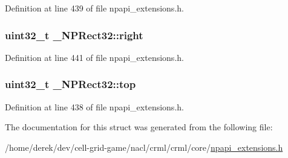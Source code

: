 Definition at line 439 of file npapi\_\-extensions.h.

\hypertarget{struct___n_p_rect32_add79a8f646aedef1922117689f857020}{
\subsubsection[{right}]{\setlength{\rightskip}{0pt plus 5cm}uint32\_\-t {\bf \_\-NPRect32::right}}}
\label{struct___n_p_rect32_add79a8f646aedef1922117689f857020}


Definition at line 441 of file npapi\_\-extensions.h.

\hypertarget{struct___n_p_rect32_aad5fdab264c55fd147ddf01407162cc6}{
\subsubsection[{top}]{\setlength{\rightskip}{0pt plus 5cm}uint32\_\-t {\bf \_\-NPRect32::top}}}
\label{struct___n_p_rect32_aad5fdab264c55fd147ddf01407162cc6}


Definition at line 438 of file npapi\_\-extensions.h.



The documentation for this struct was generated from the following file:\begin{DoxyCompactItemize}
\item 
/home/derek/dev/cell-\/grid-\/game/nacl/crml/crml/core/\hyperlink{npapi__extensions_8h}{npapi\_\-extensions.h}\end{DoxyCompactItemize}
